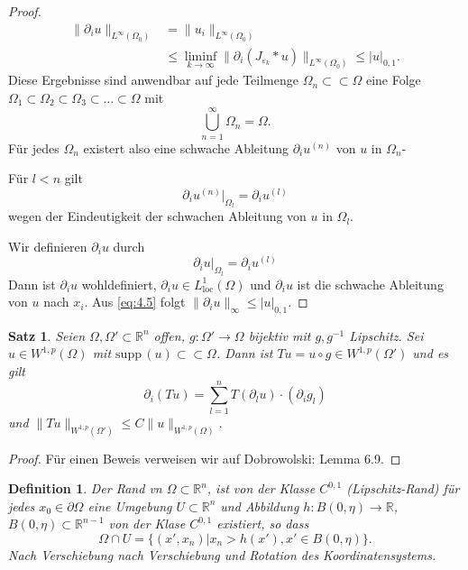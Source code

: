 \documentclass[
paper=a4,
bibtotocnumbered,
liststotocnumbered,
tablecaptionabove,
pointlessnumbers,
twoside,
openright,
10pt
]
{report}
\newcommand{\supp}{\mathrm{supp}\,}
\newtheorem{satz}[thm]{Satz}
\newtheorem{df}[thm]{Definition}
\theoremstyle{definition}
\numberwithin{equation}{chapter}
\begin{document}
\begin{proof}
\begin{equation}
\begin{split}
\| \partial_i u\|_{L^\infty(\Omega_0)} &= \| u_i \|_{L^\infty(\Omega_0)} \\
&\le \liminf_{k\to \infty} \| \partial_i (J_{\varepsilon_k} * u) \|_{L^\infty(\Omega_0)} \le |u|_{0,1}. 
\end{split}
\end{equation}
Diese Ergebnisse sind anwendbar auf jede Teilmenge $\Omega_n\subset \subset \Omega$ eine Folge $\Omega_1 \subset \Omega_2 \subset \Omega_3 \subset \ldots \subset \Omega$ mit
\begin{equation}
 \bigcup_{n=1}^\infty \Omega_n = \Omega.
\end{equation}
Für jedes $\Omega_n$ existert also eine schwache Ableitung $\partial_i u^{(n)}$ von $u$ in $\Omega_n$-

Für $l<n$ gilt 
\begin{equation}
  \partial_i u^{(n)} \big |_{\Omega_l} = \partial_i u^{(l)}
\end{equation}
wegen der Eindeutigkeit der schwachen Ableitung von $u$ in $\Omega_l$.

Wir definieren $\partial_i u$ durch
\begin{equation}
 \partial_i u\big |_{\Omega_l}  = \partial_i u^{(l)}
\end{equation}
Dann ist $\partial_i u$ wohldefiniert, $\partial_i u\in L^1_{\text{loc}}(\Omega)$ und $\partial_i u$ ist die schwache Ableitung von $u$ nach $x_i$.  Aus \eqref{eq:4.5} folgt $\|\partial_i u\|_\infty \le |u|_{0,1}$.
\end{proof}
\begin{satz}\label{4.5}
 Seien $\Omega, \Omega'\subset \mathbb R^n$ offen, $g: \Omega' \to \Omega$ bijektiv mit $g, g^{-1}$ Lipschitz. Sei $u\in W^{1,p}(\Omega)$ mit $\supp(u) \subset \subset \Omega$. Dann ist $Tu=u\circ g \in W^{1,p}(\Omega')$ und es gilt
 \begin{equation}
  \partial_i (Tu) = \sum_{l=1}^n T(\partial_l u) \cdot (\partial_i g_l)
 \end{equation}
und $\|Tu\|_{W^{1,p}(\Omega')} \le C\|u\|_{W^{1,p}(\Omega)}$.
\end{satz}
\begin{proof}
 Für einen Beweis verweisen wir auf Dobrowolski: Lemma 6.9.
\end{proof}

\begin{df}
 Der Rand vn $\Omega \subset \mathbb R^n$, ist von der Klasse $C^{0,1}$ (Lipschitz-Rand) für jedes $x_0 \in \partial \Omega$ eine Umgebung $U\subset \mathbb R^n$ und Abbildung $h: B(0, \eta) \to \mathbb R$, $B(0,\eta) \subset \mathbb R^{n-1}$ von der Klase $C^{0,1}$ existiert, so dass
 \begin{equation}
  \Omega \cap U = \{(x', x_n) | x_n > h(x'), x'\in B(0,\eta)\}.
 \end{equation}
 Nach Verschiebung nach Verschiebung und Rotation des Koordinatensystems.
\end{df}
\end{document}
